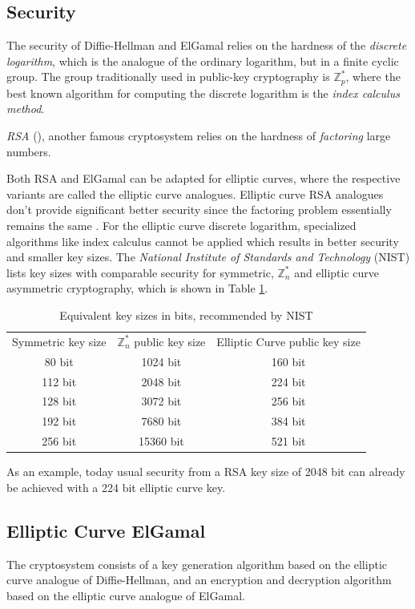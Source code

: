 \documentclass[11pt,english]{article}
\begin{document}
\subsection{Security}
The security of Diffie-Hellman and ElGamal relies on the hardness of the \emph{discrete logarithm}, which is the analogue of the ordinary logarithm, but in a finite cyclic group. The group traditionally used in public-key cryptography is $\mathbb{Z}_p^*$, where the best known algorithm for computing the discrete logarithm is the \emph{index calculus method}.

\emph{RSA} (\cite{Rivest78amethod}), another famous cryptosystem relies on the hardness of \emph{factoring} large numbers.

Both RSA and ElGamal can be adapted for elliptic curves, where the respective variants are called the elliptic curve analogues. Elliptic curve RSA analogues don't provide significant better security since the factoring problem essentially remains the same \cite{343485}. For the elliptic curve discrete logarithm, specialized algorithms like index calculus cannot be applied which results in better security and smaller key sizes. The \emph{National Institute of Standards and Technology} (NIST) lists key sizes with comparable security for symmetric, $\mathbb{Z}_n^*$ and elliptic curve asymmetric cryptography, which is shown in Table \ref{eqks}.

\begin{table}
\centering
\begin{tabular}{c|c|c}
Symmetric key size & $\mathbb{Z}_{n}^{*}$ public key size & Elliptic Curve public key size \\ \cline{1-3}
80 bit & 1024 bit & 160 bit \\ 
112 bit & 2048 bit & 224 bit \\ 
128 bit & 3072 bit & 256 bit \\ 
192 bit & 7680 bit & 384 bit \\ 
256 bit & 15360 bit & 521 bit
\end{tabular}
\caption{Equivalent key sizes in bits, recommended by NIST}
\label{eqks}
\end{table}

As an example, today usual security from a RSA key size of 2048 bit can already be achieved with a 224 bit elliptic curve key.

\subsection{Elliptic Curve ElGamal}
\label{Elliptic Curve ElGamal}
The cryptosystem consists of a key generation algorithm based on the elliptic curve analogue of Diffie-Hellman, and an encryption and decryption algorithm based on the elliptic curve analogue of ElGamal.
\end{document}
